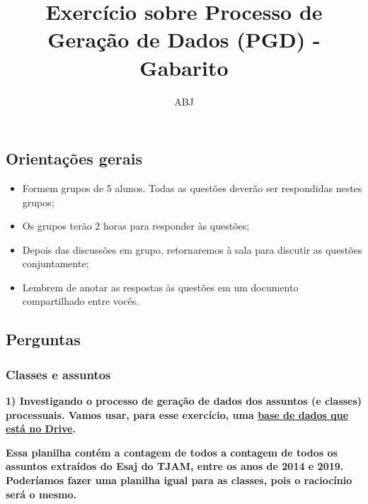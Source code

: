 \documentclass[
  letterpaper,
  DIV=11,
  numbers=noendperiod]{scrartcl}
\title{Exercício sobre Processo de Geração de Dados (PGD) - Gabarito}
\author{ABJ}
\date{}
\providecommand{\tightlist}{%
  \setlength{\itemsep}{0pt}\setlength{\parskip}{0pt}}\usepackage{longtable,booktabs,array}
\begin{document}
\maketitle
\ifdefined\Shaded\renewenvironment{Shaded}{\begin{tcolorbox}[frame hidden, interior hidden, boxrule=0pt, breakable, sharp corners, borderline west={3pt}{0pt}{shadecolor}, enhanced]}{\end{tcolorbox}}\fi

\hypertarget{orientauxe7uxf5es-gerais}{%
\subsection{Orientações gerais}\label{orientauxe7uxf5es-gerais}}

\begin{itemize}
\tightlist
\item
  Formem grupos de 5 alunos. Todas as questões deverão ser respondidas
  nestes grupos;
\item
  Os grupos terão 2 horas para responder às questões;
\item
  Depois das discussões em grupo, retornaremos à sala para discutir as
  questões conjuntamente;
\item
  Lembrem de anotar as respostas às questões em um documento
  compartilhado entre vocês.
\end{itemize}

\newpage{}

\hypertarget{perguntas}{%
\subsection{Perguntas}\label{perguntas}}

\hypertarget{classes-e-assuntos}{%
\subsubsection{Classes e assuntos}\label{classes-e-assuntos}}

\textbf{1) Investigando o processo de geração de dados dos assuntos (e
classes) processuais. Vamos usar, para esse exercício, uma
\href{https://docs.google.com/spreadsheets/d/1W0a0MPpszNYEbS6x8ytDwYF78rcU8_qhgOO4ke22sSw/edit\#gid=0}{base
de dados que está no Drive}.}

\textbf{Essa planilha contém a contagem de todos a contagem de todos os
assuntos extraídos do Esaj do TJAM, entre os anos de 2014 e 2019.
Poderíamos fazer uma planilha igual para as classes, pois o raciocínio
será o mesmo.}
\end{document}
